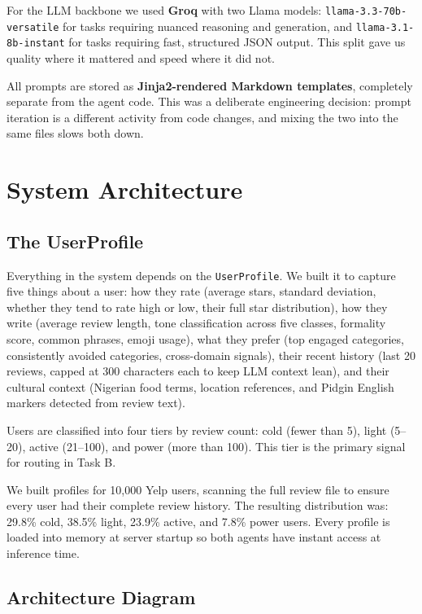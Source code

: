 \documentclass[11pt,a4paper]{article}
\begin{document}
For the LLM backbone we used \textbf{Groq} with two Llama models:
\texttt{llama-3.3-70b-versatile} for tasks requiring nuanced reasoning and
generation, and \texttt{llama-3.1-8b-instant} for tasks requiring fast,
structured JSON output. This split gave us quality where it mattered and
speed where it did not.

All prompts are stored as \textbf{Jinja2-rendered Markdown templates},
completely separate from the agent code. This was a deliberate engineering
decision: prompt iteration is a different activity from code changes, and
mixing the two into the same files slows both down.

\section{System Architecture}

\subsection{The UserProfile}

Everything in the system depends on the \texttt{UserProfile}. We built it
to capture five things about a user: how they rate (average stars, standard
deviation, whether they tend to rate high or low, their full star
distribution), how they write (average review length, tone classification
across five classes, formality score, common phrases, emoji usage), what
they prefer (top engaged categories, consistently avoided categories,
cross-domain signals), their recent history (last 20 reviews, capped at
300 characters each to keep LLM context lean), and their cultural context
(Nigerian food terms, location references, and Pidgin English markers
detected from review text).

Users are classified into four tiers by review count: cold (fewer than 5),
light (5--20), active (21--100), and power (more than 100). This tier is
the primary signal for routing in Task B.

We built profiles for 10,000 Yelp users, scanning the full review file to
ensure every user had their complete review history. The resulting
distribution was: 29.8\% cold, 38.5\% light, 23.9\% active, and 7.8\%
power users. Every profile is loaded into memory at server startup so both
agents have instant access at inference time.

\subsection{Architecture Diagram}
\end{document}
